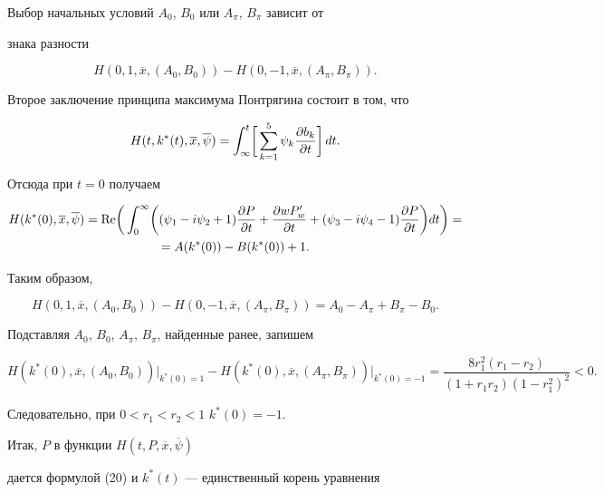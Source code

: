 Выбор начальных условий $A_0$, $B_0$ или $A_{\pi}$, $B_{\pi}$ зависит от


знака разности


$$


H(0, 1, \overline x,(A_0,B_0))-H(0,-1,\overline x,(A_{\pi},B_{\pi})).


$$


Второе заключение принципа максимума Понтрягина состоит в том, что


$$


H(t,k^*(t),\overline x, \overline \psi )=\int_{\infty}^t \biggl[\,


\sum_{k=1}^5 \psi_k \pde{b_k}{t} \biggr]\,dt.


$$


Отсюда при $t=0$ получаем


\begin{multline*}


H(k^*(0),\overline x,\overline \psi )=\re \biggl(\,\int_0^{\infty}\biggl(


(\psi_1-i\psi_2+1) \pde{P}{t}+\pde{wP'_w}{t} + (\psi_3-i\psi_4-1)\pde{P}{t}


\biggr)dt \biggr) = \\


%


= A(k^*(0))-B(k^*(0)) + 1.


\end{multline*}


Таким образом,


$$


H(0, 1,\overline x,(A_0,B_0))-H(0, -1,\overline x,(A_{\pi},B_{\pi}))


= A_0-A_{\pi} + B_{\pi}-B_0.


$$


Подставляя $A_0$, $B_0$, $A_{\pi}$, $B_{\pi} $, найденные ранее, запишем


$$


H(k^*(0),\overline x,(A_0,B_0))\big|_{k^*(0)=1}


-H(k^*(0),\overline x,(A_{\pi},B_{\pi}))\big|_{k^*(0)=-1} =


\frac {8r_1^2(r_1-r_2)}{(1 + r_1r_2)(1-r_1^2)^2} < 0.


$$


Следовательно, при $0 < r_1 < r_2 < 1$\; $k^*(0)=-1$.





Итак, $P$ в функции $H(t,P,\overline x,\overline {\psi})$


дается формулой (20) и $k^*(t)$ --- единственный корень уравнения


